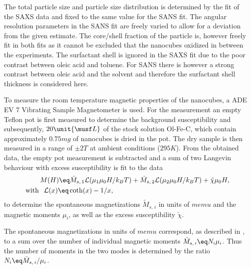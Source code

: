 \documentclass[\main/dresen_thesis.tex]{subfiles}
\begin{document}
    The total particle size and particle size distribution is determined by the fit of the SAXS data and fixed to the same value for the SANS fit.
    The angular resolution parameters in the SANS fit are freely varied to allow for a deviation from the given estimate.
    The core/shell fraction of the particle is, however freely fit in both fits as it cannot be excluded that the nanocubes oxidized in between the experiments.
    The surfactant shell is ignored in the SAXS fit due to the poor contrast between oleic acid and toluene.
    For SANS there is however a strong contrast between oleic acid and the solvent and therefore the surfactant shell thickness is considered here.

    To measure the room temperature magnetic properties of the nanocubes, a ADE EV 7 Vibrating Sample Magnetometer is used.
    For the measurement an empty Teflon pot is first measured to determine the background susceptibility and subsequently, $20 \unit{\musf L}$ of the stock solution Ol-Fe-C, which contain approximately $0.75 \unit{mg}$ of nanocubes is dried in the pot.
    The dry sample is then measured in a range of $\pm 2 \unit{T}$ at ambient conditions ($295 \unit{K}$).
    From the obtained data, the empty pot measurement is subtracted and a sum of two Langevin behaviour with excess susceptibility is fit to the data
    \begin{align}
      \begin{split}
        &M(H) \eq \tilde{M}_{s,\,1} \mathcal{L}( \mu_1 \mu_0 H / k_B T) + \tilde{M}_{s,\,2}  \mathcal{L}(  \mu_2 \mu_0 H / k_B T) + \tilde{\chi} \mu_0H,\\
        \mathrm{with\,} & \hspace{0.2cm} \mathcal{L}(x) \eq \coth(x) - 1/x,
      \end{split}
    \end{align}
    to determine the spontaneous magnetizations $\tilde{M}_{s,\,i}$ in units of $\unit{memu}$ and the magnetic moments $\mu_i$, as well as the excess susceptibility $\tilde{\chi}$.
    
    The spontaneous magnetizations in units of $\unit{memu}$ correspond, as described in , to a sum over the number of individual magnetic moments $\tilde{M}_{s,\,i} \eq N_i \mu_i$.
    Thus the number of moments in the two modes is determined by the ratio $N_i \eq \tilde{M}_{s,\,i} / \mu_i$.
\end{document}
